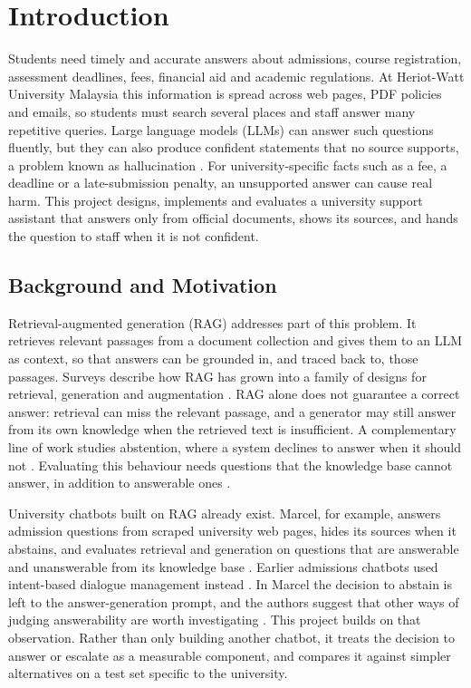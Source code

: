 \section{Introduction} \label{cha:intro}

Students need timely and accurate answers about admissions, course registration, assessment deadlines, fees, financial aid and academic regulations. At Heriot-Watt University Malaysia this information is spread across web pages, PDF policies and emails, so students must search several places and staff answer many repetitive queries. Large language models (LLMs) can answer such questions fluently, but they can also produce confident statements that no source supports, a problem known as hallucination \cite{ji2023survey}. For university-specific facts such as a fee, a deadline or a late-submission penalty, an unsupported answer can cause real harm. This project designs, implements and evaluates a university support assistant that answers only from official documents, shows its sources, and hands the question to staff when it is not confident.

\subsection{Background and Motivation} \label{sec:intro_motiv}

Retrieval-augmented generation (RAG) \cite{lewis2020rag} addresses part of this problem. It retrieves relevant passages from a document collection and gives them to an LLM as context, so that answers can be grounded in, and traced back to, those passages. Surveys describe how RAG has grown into a family of designs for retrieval, generation and augmentation \cite{gao2023rag}. RAG alone does not guarantee a correct answer: retrieval can miss the relevant passage, and a generator may still answer from its own knowledge when the retrieved text is insufficient. A complementary line of work studies abstention, where a system declines to answer when it should not \cite{wen2025know}. Evaluating this behaviour needs questions that the knowledge base cannot answer, in addition to answerable ones \cite{peng2025unanswerability}.

University chatbots built on RAG already exist. Marcel, for example, answers admission questions from scraped university web pages, hides its sources when it abstains, and evaluates retrieval and generation on questions that are answerable and unanswerable from its knowledge base \cite{trienes2025marcel}. Earlier admissions chatbots used intent-based dialogue management instead \cite{nguyen2021neu}. In Marcel the decision to abstain is left to the answer-generation prompt, and the authors suggest that other ways of judging answerability are worth investigating \cite{trienes2025marcel}. This project builds on that observation. Rather than only building another chatbot, it treats the decision to answer or escalate as a measurable component, and compares it against simpler alternatives on a test set specific to the university.

